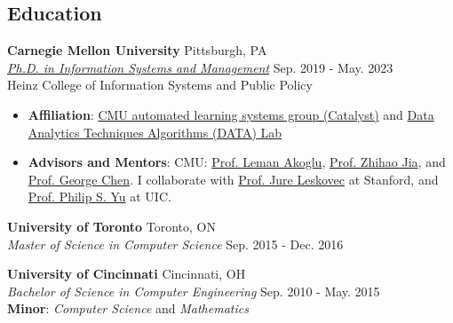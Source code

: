 \documentclass[margin,line,pifont,palatino,courier]{res}
\begin{document}
\begin{resume}
\section{\sc Education}

\textbf{Carnegie Mellon University} \hfill Pittsburgh, PA \\
\href{https://www.heinz.cmu.edu/programs/phd-programs/information-systems-management}{\textit{Ph.D. in Information Systems and Management}}  \hfill Sep. 2019 - May. 2023 \\
Heinz College of Information Systems and Public Policy

\begin{itemize}[leftmargin=*]
\setlength\itemsep{-0.1em}
\item \textbf{Affiliation}: \href{https://catalyst.cs.cmu.edu/}{CMU automated learning systems group (Catalyst)}
and \href{https://datalab.heinz.cmu.edu/}{Data Analytics Techniques Algorithms (DATA) Lab} 
\item \textbf{Advisors and Mentors}: CMU: 
\href{http://www.cs.cmu.edu/~lakoglu/}{Prof. Leman Akoglu},
\href{https://cs.cmu.edu/~zhihaoj2}{Prof. Zhihao Jia}, and \href{http://www.andrew.cmu.edu/user/georgech/}{Prof. George Chen}.
I collaborate with \href{https://cs.stanford.edu/~jure/}{Prof. Jure Leskovec} at Stanford, %
and \href{https://cs.uic.edu/profiles/philip-yu/}{Prof. Philip S. Yu} at UIC.
\end{itemize}

\textbf{University of Toronto}  \hfill Toronto, ON\\
\textit{Master of Science in Computer Science %
} \hfill Sep. 2015 - Dec. 2016 


\textbf{University of Cincinnati} \hfill Cincinnati, OH\\
\textit{Bachelor of Science in Computer Engineering}  \hfill Sep. 2010 - May. 2015 \\
    \textbf{Minor}: \textit{Computer Science} and \textit{Mathematics}


\end{resume}
\end{document}
